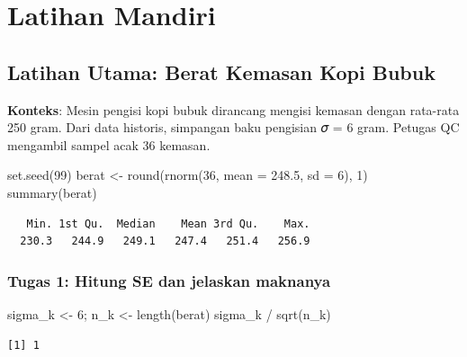 \documentclass[
  indonesian,
  letterpaper,
]{book}
\newenvironment{Shaded}{\begin{snugshade}}{\end{snugshade}}
\newcommand{\AttributeTok}[1]{\textcolor[rgb]{0.40,0.45,0.13}{#1}}
\newcommand{\DecValTok}[1]{\textcolor[rgb]{0.68,0.00,0.00}{#1}}
\newcommand{\FloatTok}[1]{\textcolor[rgb]{0.68,0.00,0.00}{#1}}
\newcommand{\FunctionTok}[1]{\textcolor[rgb]{0.28,0.35,0.67}{#1}}
\newcommand{\NormalTok}[1]{\textcolor[rgb]{0.00,0.23,0.31}{#1}}
\newcommand{\OtherTok}[1]{\textcolor[rgb]{0.00,0.23,0.31}{#1}}
\newcommand{\SpecialCharTok}[1]{\textcolor[rgb]{0.37,0.37,0.37}{#1}}
\begin{document}

\chapter{Latihan Mandiri}\label{latihan-mandiri}

\section{Latihan Utama: Berat Kemasan Kopi
Bubuk}\label{latihan-utama-berat-kemasan-kopi-bubuk}

\textbf{Konteks}: Mesin pengisi kopi bubuk dirancang mengisi kemasan
dengan rata-rata 250 gram. Dari data historis, simpangan baku pengisian
𝜎 = 6 gram. Petugas QC mengambil sampel acak 36 kemasan.

\begin{Shaded}
\begin{Highlighting}[]
\FunctionTok{set.seed}\NormalTok{(}\DecValTok{99}\NormalTok{)}
\NormalTok{berat }\OtherTok{\textless{}{-}} \FunctionTok{round}\NormalTok{(}\FunctionTok{rnorm}\NormalTok{(}\DecValTok{36}\NormalTok{, }\AttributeTok{mean =} \FloatTok{248.5}\NormalTok{, }\AttributeTok{sd =} \DecValTok{6}\NormalTok{), }\DecValTok{1}\NormalTok{)}
\FunctionTok{summary}\NormalTok{(berat)}
\end{Highlighting}
\end{Shaded}

\begin{verbatim}
   Min. 1st Qu.  Median    Mean 3rd Qu.    Max. 
  230.3   244.9   249.1   247.4   251.4   256.9 
\end{verbatim}

\subsection{Tugas 1: Hitung SE dan jelaskan
maknanya}\label{tugas-1-hitung-se-dan-jelaskan-maknanya}

\begin{Shaded}
\begin{Highlighting}[]
\NormalTok{sigma\_k }\OtherTok{\textless{}{-}} \DecValTok{6}\NormalTok{; n\_k }\OtherTok{\textless{}{-}} \FunctionTok{length}\NormalTok{(berat)}
\NormalTok{sigma\_k }\SpecialCharTok{/} \FunctionTok{sqrt}\NormalTok{(n\_k)}
\end{Highlighting}
\end{Shaded}

\begin{verbatim}
[1] 1
\end{verbatim}
\end{document}
